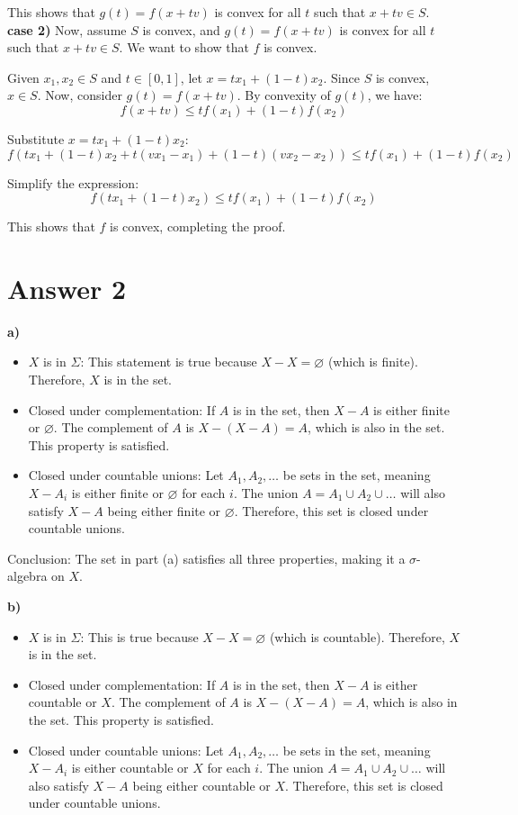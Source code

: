 \documentclass[12pt]{article}
\begin{document}
This shows that $g(t) = f(x + tv)$ is convex for all $t$ such that $x + tv \in S$.\\
\textbf{case 2)}
Now, assume $S$ is convex, and $g(t) = f(x + tv)$ is convex for all $t$ such that $x + tv \in S$. We want to show that $f$ is convex.

Given $x_1, x_2 \in S$ and $t \in [0, 1]$, let $x = tx_1 + (1-t)x_2$. Since $S$ is convex, $x \in S$. Now, consider $g(t) = f(x + tv)$. By convexity of $g(t)$, we have:
\[f(x + tv) \leq tf(x_1) + (1-t)f(x_2)\]

Substitute $x = tx_1 + (1-t)x_2$:
\[f(tx_1 + (1-t)x_2 + t(vx_1 - x_1) + (1-t)(vx_2 - x_2)) \leq t f(x_1) + (1-t) f(x_2)\]

Simplify the expression:
\[f(tx_1 + (1-t)x_2) \leq t f(x_1) + (1-t) f(x_2)\]

This shows that $f$ is convex, completing the proof.

\section*{Answer 2}


\textbf{a)}
\begin{itemize}
    \item \( X \) is in \( \Sigma \): This statement is true because \( X - X = \varnothing \) (which is finite). Therefore, \( X \) is in the set.
    \item Closed under complementation: If \( A \) is in the set, then \( X - A \) is either finite or \( \varnothing \). The complement of \( A \) is \( X - (X - A) = A \), which is also in the set. This property is satisfied.
    \item Closed under countable unions: Let \( A_1, A_2, \ldots \) be sets in the set, meaning \( X - A_i \) is either finite or \( \varnothing \) for each \( i \). The union \( A = A_1 \cup A_2 \cup \ldots \) will also satisfy \( X - A \) being either finite or \( \varnothing \). Therefore, this set is closed under countable unions.
\end{itemize}

Conclusion: The set in part (a) satisfies all three properties, making it a \( \sigma \)-algebra on \( X \).

\textbf{b)}
\begin{itemize}
    \item \( X \) is in \( \Sigma \): This is true because \( X - X = \varnothing \) (which is countable). Therefore, \( X \) is in the set.
    \item Closed under complementation: If \( A \) is in the set, then \( X - A \) is either countable or \( X \). The complement of \( A \) is \( X - (X - A) = A \), which is also in the set. This property is satisfied.
    \item Closed under countable unions: Let \( A_1, A_2, \ldots \) be sets in the set, meaning \( X - A_i \) is either countable or \( X \) for each \( i \). The union \( A = A_1 \cup A_2 \cup \ldots \) will also satisfy \( X - A \) being either countable or \( X \). Therefore, this set is closed under countable unions.
\end{itemize}
\end{document}
